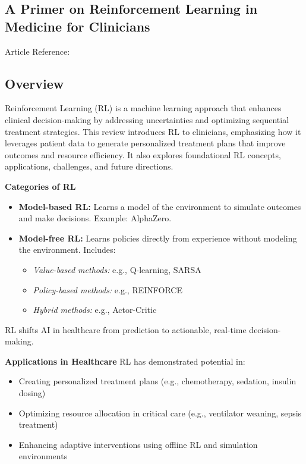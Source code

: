 \subsection{A Primer on Reinforcement Learning in Medicine for Clinicians}
Article Reference: \cite{article_1}

\subsection*{Overview}
Reinforcement Learning (RL) is a machine learning approach that enhances clinical decision-making by addressing uncertainties and optimizing sequential treatment strategies. This review introduces RL to clinicians, emphasizing how it leverages patient data to generate personalized treatment plans that improve outcomes and resource efficiency. It also explores foundational RL concepts, applications, challenges, and future directions.

\textbf{Categories of RL}
\begin{itemize} \item \textbf{Model-based RL:} Learns a model of the environment to simulate outcomes and make decisions. Example: AlphaZero. \item \textbf{Model-free RL:} Learns policies directly from experience without modeling the environment. Includes: \begin{itemize} \item \textit{Value-based methods:} e.g., Q-learning, SARSA \item \textit{Policy-based methods:} e.g., REINFORCE \item \textit{Hybrid methods:} e.g., Actor-Critic \end{itemize} \end{itemize}

RL shifts AI in healthcare from prediction to actionable, real-time decision-making.

\textbf{Applications in Healthcare}
RL has demonstrated potential in: \begin{itemize} \item Creating personalized treatment plans (e.g., chemotherapy, sedation, insulin dosing) \item Optimizing resource allocation in critical care (e.g., ventilator weaning, sepsis treatment) \item Enhancing adaptive interventions using offline RL and simulation environments \end{itemize}

